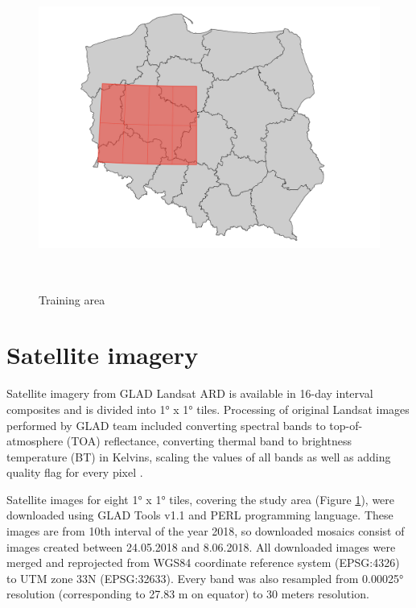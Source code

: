 \documentclass{amuthesis}
\begin{document}
\begin{figure}[t]

{\centering \includegraphics[width=1\textwidth,height=4.16667in]{./figures/study_area.png}

}

\caption{\label{fig-rycina1}Training area}

\end{figure}

\hypertarget{sec-sat}{%
\section{Satellite imagery}\label{sec-sat}}

Satellite imagery from GLAD Landsat ARD is available in 16-day interval
composites and is divided into 1° x 1° tiles. Processing of original
Landsat images performed by GLAD team included converting spectral bands
to top-of-atmosphere (TOA) reflectance, converting thermal band to
brightness temperature (BT) in Kelvins, scaling the values of all bands
as well as adding quality flag for every pixel
\autocite{potapov_landsat_2020}.

Satellite images for eight 1° x 1° tiles, covering the study area
(Figure \ref{fig-rycina1}), were downloaded using GLAD Tools v1.1 and
PERL programming language. These images are from 10th interval of the
year 2018, so downloaded mosaics consist of images created between
24.05.2018 and 8.06.2018. All downloaded images were merged and
reprojected from WGS84 coordinate reference system (EPSG:4326) to UTM
zone 33N (EPSG:32633). Every band was also resampled from 0.00025°
resolution (corresponding to 27.83 m on equator) to 30 meters
resolution.
\end{document}
